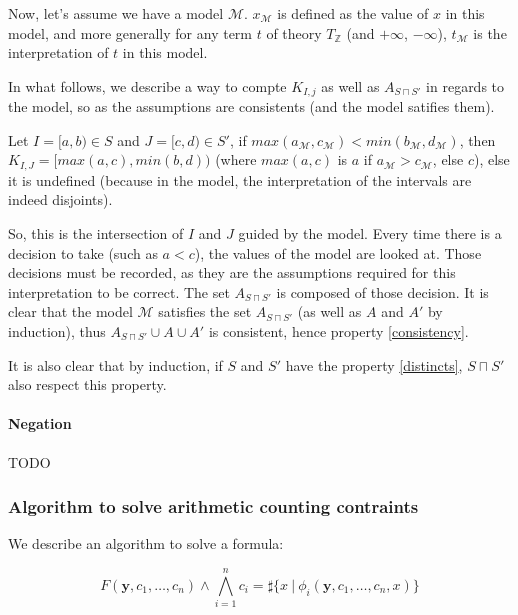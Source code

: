 \documentclass[]{article}
\begin{document}
Now, let's assume we have a model $\mathcal{M}$. $x_\mathcal{M}$ is
defined as the value of $x$ in this model, and more generally for any
term $t$ of theory $T_{\mathbb{Z}}$ (and $+\infty$, $-\infty$),
$t_{\mathcal{M}}$ is the interpretation of $t$ in this model.

In what follows, we describe a way to compte $K_{I, j}$ as well as
$A_{S \sqcap S'}$ in regards to the model, so as the assumptions are
consistents (and the model satifies them).

Let $I = [a, b) \in S$ and $J = [c, d) \in S'$, if
$max(a_\mathcal{M}, c_\mathcal{M}) < min(b_\mathcal{M}, d_\mathcal{M})$,
then $K_{I, J} = [max(a, c), min(b, d))$ (where $max(a, c)$ is $a$
if $a_\mathcal{M} > c_\mathcal{M}$, else $c$), else it is undefined
(because in the model, the interpretation of the intervals are indeed
disjoints).

So, this is the intersection of $I$ and $J$ guided by the model.
Every time there is a decision to take (such as $a < c$), the values
of the model are looked at. Those decisions must be recorded, as they
are the assumptions required for this interpretation to be correct. The
set $A_{S\sqcap S'}$ is composed of those decision. It is clear that
the model $\mathcal{M}$ satisfies the set $A_{S \sqcap S'}$ (as well
as $A$ and $A'$ by induction), thus
$A_{S \sqcap S'} \cup A \cup A'$ is consistent, hence property
\ref{consistency}.

It is also clear that by induction, if $S$ and $S'$ have the
property \ref{distincts}, $S\sqcap S'$ also respect this property.

\paragraph{Negation}\label{negation}

TODO

\subsubsection{Algorithm to solve arithmetic counting
contraints}\label{algorithm-to-solve-arithmetic-counting-contraints}

We describe an algorithm to solve a formula:

\begin{equation}
F(\mathbf{y}, c_1, \ldots, c_n) \land
\bigwedge_{i = 1} ^n c_i = \sharp\{x\ |\ \phi_i(\mathbf{y}, c_1, \ldots, c_n, x)\}
\end{equation}
\end{document}
